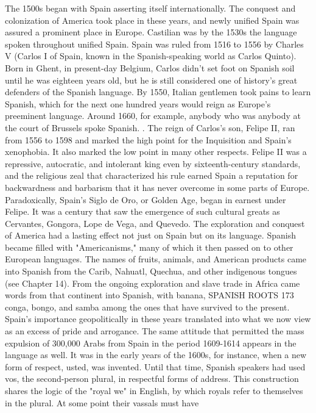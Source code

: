The 1500s began with Spain asserting itself internationally.
The conquest and colonization of America took place in these years,
and newly unified Spain was assured a prominent place in Europe.
Castilian was by the 1530s the language spoken throughout unified
Spain. Spain was ruled from 1516 to 1556 by Charles V (Carlos I of
Spain, known in the Spanish-speaking world as Carlos Quinto). Born
in Ghent, in present-day Belgium, Carlos didn't set foot on Spanish
soil until he was eighteen years old, but he is still considered one of
history's great defenders of the Spanish language. By 1550, Italian gentlemen took pains to learn Spanish, which for the next one hundred
years would reign as Europe's preeminent language. Around 1660, for
example, anybody who was anybody at the court of Brussels spoke
Spanish. .
The reign of Carlos's son, Felipe II, ran from 1556 to 1598 and
marked the high point for the Inquisition and Spain's xenophobia. It
also marked the low point in many other respects. Felipe II was a repressive, autocratic, and intolerant king even by sixteenth-century
standards, and the religious zeal that characterized his rule earned
Spain a reputation for backwardness and barbarism that it has never
overcome in some parts of Europe. Paradoxically, Spain's Siglo de Oro,
or Golden Age, began in earnest under Felipe. It was a century that saw
the emergence of such cultural greats as Cervantes, Gongora, Lope de
Vega, and Quevedo.
The exploration and conquest of America had a lasting effect
not just on Spain but on its language. Spanish became filled with
"Americanisms," many of which it then passed on to other European
languages. The names of fruits, animals, and American products came
into Spanish from the Carib, Nahuatl, Quechua, and other indigenous
tongues (see Chapter 14). From the ongoing exploration and slave trade
in Africa came words from that continent into Spanish, with banana,
SPANISH ROOTS 173
conga, bongo, and samba among the ones that have survived to the
present.
Spain's importance geopolitically in these years translated into
what we now view as an excess of pride and arrogance. The same attitude that permitted the mass expulsion of 300,000 Arabs from Spain
in the period 1609-1614 appears in the language as well. It was in
the early years of the 1600s, for instance, when a new form of respect,
usted, was invented. Until that time, Spanish speakers had used vos,
the second-person plural, in respectful forms of address. This construction shares the logic of the "royal we" in English, by which royals refer to themselves in the plural. At some point their vassals must have
